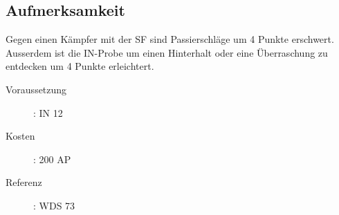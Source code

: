 \subsection{Aufmerksamkeit}
\label{sf.aufmerksamkeit}
Gegen einen Kämpfer mit der SF  sind Passierschläge um 4 Punkte erschwert.
Ausserdem ist die IN-Probe um einen Hinterhalt oder eine Überraschung zu entdecken um 4 Punkte erleichtert.
\begin{description}
    \item[Voraussetzung]:
        IN 12
    \item [Kosten]:
        200 AP
    \item [Referenz]:
        WDS 73
\end{description}
